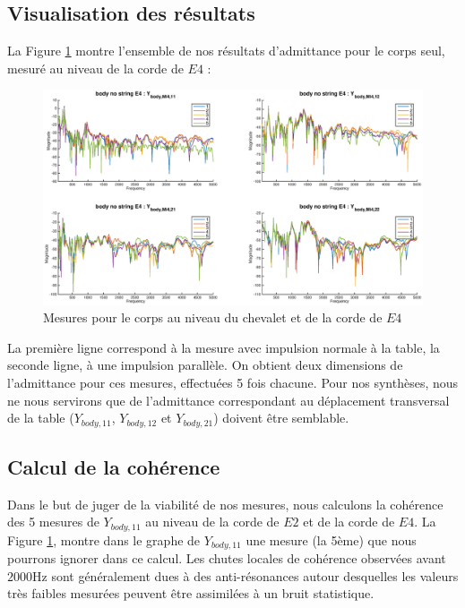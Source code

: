 \subsection{Visualisation des résultats}
La Figure \ref{fig:goll} montre l'ensemble de nos résultats d'admittance pour le corps seul, mesuré au niveau de la corde de \( E4 \) : 
\begin{figure}[h]
\centering
\includegraphics[width = \linewidth]{figures/Y_body_E4.eps}
\caption{Mesures pour le corps au niveau du chevalet et de la corde de \( E4 \)}
\label{fig:goll}
\end{figure}
La première ligne correspond à la mesure avec impulsion normale à la table, la seconde ligne, à une impulsion parallèle. On obtient deux dimensions de l'admittance pour ces mesures, effectuées 5 fois chacune. Pour nos synthèses, nous ne nous servirons que de l'admittance correspondant au déplacement transversal de la table ($Y_{body,11}$, $Y_{body,12}$ et $Y_{body,21}$) doivent être semblable.

\subsection{Calcul de la cohérence}
Dans le but de juger de la viabilité de nos mesures, nous calculons la cohérence des 5 mesures de $Y_{body,11}$ au niveau de la corde de \( E2 \) et de la corde de \( E4 \). La Figure \ref{fig:goll},  montre dans le graphe de $Y_{body,11}$ une mesure (la 5ème) que nous pourrons ignorer dans ce calcul. Les chutes locales de cohérence observées avant \( \si{2000\Hz} \) sont généralement dues à des anti-résonances autour desquelles les valeurs très faibles mesurées peuvent être assimilées à un bruit statistique.


